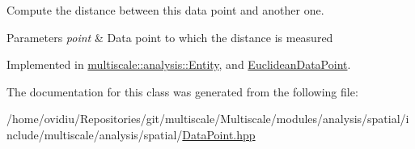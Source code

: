 Compute the distance between this data point and another one. 


\begin{DoxyParams}{Parameters}
{\em point} & Data point to which the distance is measured \\
\hline
\end{DoxyParams}


Implemented in \hyperlink{classmultiscale_1_1analysis_1_1Entity_a39cb4bb856c295c82676085d976d58e8}{multiscale\-::analysis\-::\-Entity}, and \hyperlink{classEuclideanDataPoint_a86ac3981ea67375c7854e9d84446f8e5}{Euclidean\-Data\-Point}.



The documentation for this class was generated from the following file\-:\begin{DoxyCompactItemize}
\item 
/home/ovidiu/\-Repositories/git/multiscale/\-Multiscale/modules/analysis/spatial/include/multiscale/analysis/spatial/\hyperlink{DataPoint_8hpp}{Data\-Point.\-hpp}\end{DoxyCompactItemize}
